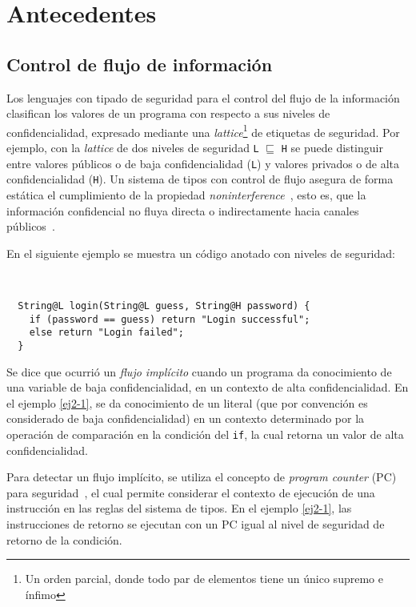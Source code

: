 \chapter{Antecedentes}

\section{Control de flujo de información}
Los lenguajes con tipado de seguridad para el control del flujo de la información clasifican los valores de un programa con respecto a sus niveles de confidencialidad, expresado mediante una \textit{lattice}\footnote{Un orden parcial, donde todo par de elementos tiene un único supremo e ínfimo} de etiquetas de seguridad. Por ejemplo, con la \textit{lattice} de dos niveles de seguridad \texttt{L} $\sqsubseteq$ \texttt{H} se puede distinguir entre valores públicos o de baja confidencialidad (\texttt{L}) y valores privados o de alta confidencialidad (\texttt{H}). Un sistema de tipos con control de flujo asegura de forma estática el cumplimiento de la propiedad \emph{noninterference}~\cite{noninterference}, esto es, que la información confidencial no fluya directa o indirectamente hacia canales públicos~\cite{volpanoAl:S96}.

En el siguiente ejemplo se muestra un código anotado con niveles de seguridad:

\begin{ej} \ \\
  \label{ej2-1}
\begin{lstlisting}
  String@L login(String@L guess, String@H password) {
    if (password == guess) return "Login successful";
    else return "Login failed";
  }
\end{lstlisting}
\end{ej}

Se dice que ocurrió un \emph{flujo implícito} cuando un programa da conocimiento de una variable de baja confidencialidad, en un contexto de alta confidencialidad. En el ejemplo \ref{ej2-1}, se da conocimiento de un literal (que por convención es considerado de baja confidencialidad) en un contexto determinado por la operación de comparación en la condición del \texttt{if}, la cual retorna un valor de alta confidencialidad.

Para detectar un flujo implícito, se utiliza el concepto de \textit{program counter} (PC) para seguridad~\cite{pc}, el cual permite considerar el contexto de ejecución de una instrucción en las reglas del sistema de tipos. En el ejemplo \ref{ej2-1}, las instrucciones de retorno se ejecutan con un PC igual al nivel de seguridad de retorno de la condición.

